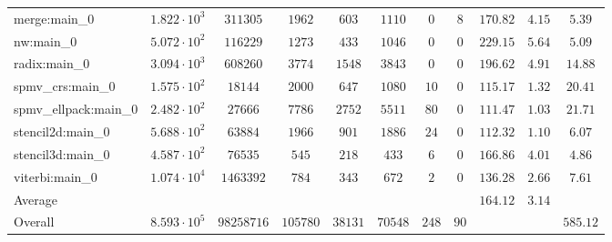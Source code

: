 \begin{tabular}{|l|c|c|c|c|c|c|c|c|c|c|}
merge:main\_0          & $ 1.822 \cdot 10^{3} $ & $ 311305   $ & $ 1962   $ & $ 603   $ & $ 1110  $ & $ 0   $ & $ 8  $ & $ 170.82      $ & $ 4.15    $ & $ 5.39    $ \\
nw:main\_0             & $ 5.072 \cdot 10^{2} $ & $ 116229   $ & $ 1273   $ & $ 433   $ & $ 1046  $ & $ 0   $ & $ 0  $ & $ 229.15      $ & $ 5.64    $ & $ 5.09    $ \\
radix:main\_0          & $ 3.094 \cdot 10^{3} $ & $ 608260   $ & $ 3774   $ & $ 1548  $ & $ 3843  $ & $ 0   $ & $ 0  $ & $ 196.62      $ & $ 4.91    $ & $ 14.88   $ \\
spmv\_crs:main\_0      & $ 1.575 \cdot 10^{2} $ & $ 18144    $ & $ 2000   $ & $ 647   $ & $ 1080  $ & $ 10  $ & $ 0  $ & $ 115.17      $ & $ 1.32    $ & $ 20.41   $ \\
spmv\_ellpack:main\_0  & $ 2.482 \cdot 10^{2} $ & $ 27666    $ & $ 7786   $ & $ 2752  $ & $ 5511  $ & $ 80  $ & $ 0  $ & $ 111.47      $ & $ 1.03    $ & $ 21.71   $ \\
stencil2d:main\_0      & $ 5.688 \cdot 10^{2} $ & $ 63884    $ & $ 1966   $ & $ 901   $ & $ 1886  $ & $ 24  $ & $ 0  $ & $ 112.32      $ & $ 1.10    $ & $ 6.07    $ \\
stencil3d:main\_0      & $ 4.587 \cdot 10^{2} $ & $ 76535    $ & $ 545    $ & $ 218   $ & $ 433   $ & $ 6   $ & $ 0  $ & $ 166.86      $ & $ 4.01    $ & $ 4.86    $ \\
viterbi:main\_0        & $ 1.074 \cdot 10^{4} $ & $ 1463392  $ & $ 784    $ & $ 343   $ & $ 672   $ & $ 2   $ & $ 0  $ & $ 136.28      $ & $ 2.66    $ & $ 7.61    $ \\
\hline
Average                & $                    $ & $          $ & $        $ & $       $ & $       $ & $     $ & $    $ & $ 164.12      $ & $ 3.14    $ & $         $ \\
\hline
Overall                & $ 8.593 \cdot 10^{5} $ & $ 98258716 $ & $ 105780 $ & $ 38131 $ & $ 70548 $ & $ 248 $ & $ 90 $ & $             $ & $         $ & $ 585.12  $ \\
\hline
\end{tabular}
